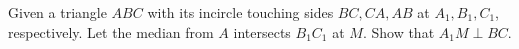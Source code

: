 Given a triangle $ABC$ with its incircle touching sides $BC,CA,AB$ at $A_1,B_1,C_1$, respectively. Let the median from $A$ intersects $B_1C_1$ at $M$. Show that $A_1M\perp BC$.
